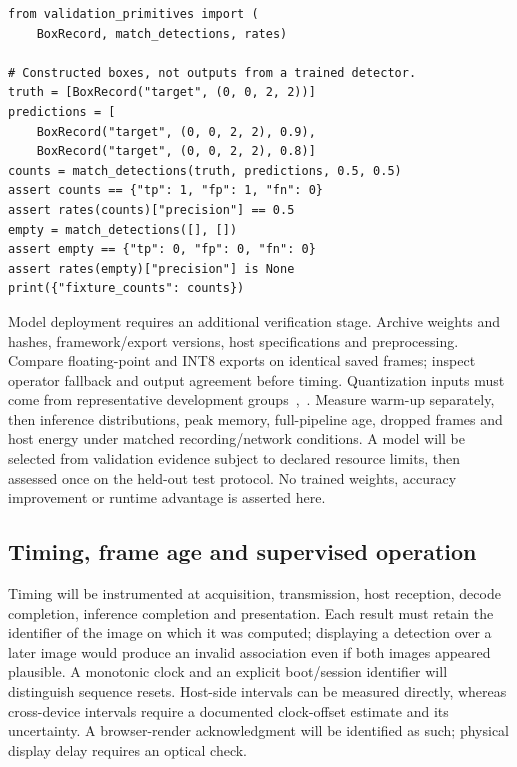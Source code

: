 \documentclass[11pt,letterpaper]{article}
\begin{document}
\begin{minipage}{\linewidth}
\begin{lstlisting}[caption={One reference object cannot produce two true positives},label={lst:2}]
from validation_primitives import (
    BoxRecord, match_detections, rates)

# Constructed boxes, not outputs from a trained detector.
truth = [BoxRecord("target", (0, 0, 2, 2))]
predictions = [
    BoxRecord("target", (0, 0, 2, 2), 0.9),
    BoxRecord("target", (0, 0, 2, 2), 0.8)]
counts = match_detections(truth, predictions, 0.5, 0.5)
assert counts == {"tp": 1, "fp": 1, "fn": 0}
assert rates(counts)["precision"] == 0.5
empty = match_detections([], [])
assert empty == {"tp": 0, "fp": 0, "fn": 0}
assert rates(empty)["precision"] is None
print({"fixture_counts": counts})
\end{lstlisting}
\end{minipage}

Model deployment requires an additional verification stage. Archive weights and hashes, framework/export versions, host specifications and preprocessing. Compare floating-point and INT8 exports on identical saved frames; inspect operator fallback and output agreement before timing. Quantization inputs must come from representative development groups~\cite{ENG_QUANT},~\cite{ENG_ONNX}. Measure warm-up separately, then inference distributions, peak memory, full-pipeline age, dropped frames and host energy under matched recording/network conditions. A model will be selected from validation evidence subject to declared resource limits, then assessed once on the held-out test protocol. No trained weights, accuracy improvement or runtime advantage is asserted here.

\subsection{Timing, frame age and supervised operation}

Timing will be instrumented at acquisition, transmission, host reception, decode completion, inference completion and presentation. Each result must retain the identifier of the image on which it was computed; displaying a detection over a later image would produce an invalid association even if both images appeared plausible. A monotonic clock and an explicit boot/session identifier will distinguish sequence resets. Host-side intervals can be measured directly, whereas cross-device intervals require a documented clock-offset estimate and its uncertainty. A browser-render acknowledgment will be identified as such; physical display delay requires an optical check.
\end{document}

